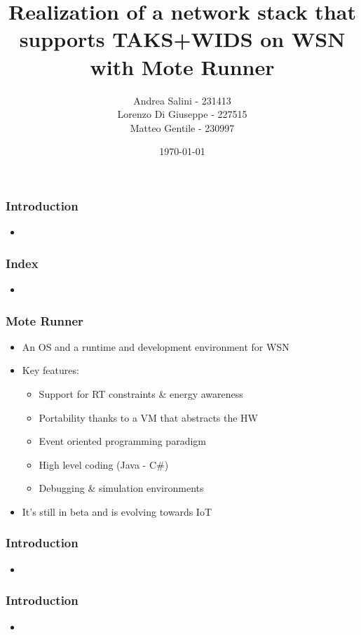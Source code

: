\documentclass[10pt, compress]{beamer}
\title{Realization of a network stack that supports TAKS+WIDS on WSN with Mote Runner}
\subtitle{}
\date{\today}
\author{Andrea Salini - 231413\\Lorenzo Di Giuseppe - 227515\\Matteo Gentile - 230997}
\institute{DISIM - Università degli Studi dell’Aquila}
\begin{document}
  \maketitle
  
\begin{frame}[fragile]
  \frametitle{Introduction}
  \begin{itemize}
    \item 
  \end{itemize}
\end{frame}

\begin{frame}[fragile]
  \frametitle{Index}
  \begin{itemize}
    \item 
  \end{itemize}
\end{frame}

\begin{frame}[fragile]
  \frametitle{Mote Runner}
  \begin{itemize}
    \item An OS and a runtime and development environment for WSN
    \item Key features:
    \begin{itemize}
      \item Support for RT constraints \& energy awareness
      \item Portability thanks to a VM that abstracts the HW
      \item Event oriented programming paradigm
      \item High level coding (Java - C\#)
      \item Debugging \& simulation environments
    \end{itemize}
    \item It’s still in beta and is evolving towards IoT
  \end{itemize}
\end{frame}

\begin{frame}[fragile]
  \frametitle{Introduction}
  \begin{itemize}
  	\item 
  \end{itemize}
\end{frame}

\begin{frame}[fragile]
  \frametitle{Introduction}
  \begin{itemize}
  	\item 
  \end{itemize}
\end{frame}
\end{document}
